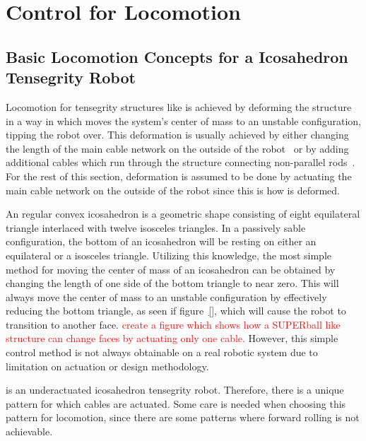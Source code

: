 \chapter{Control for \SB{} Locomotion}
\label{controls}

\section{Basic Locomotion Concepts for a Icosahedron Tensegrity Robot}
\label{basic_locomotion}

Locomotion for tensegrity structures like \SB{} is achieved by deforming the structure in a way in which moves the system's center of mass to an unstable configuration, tipping the robot over.
This deformation is usually achieved by either changing the length of the main cable network on the outside of the robot~\cite{sabelhaus2015system,kim2014rapid} or by adding additional cables which run through the structure connecting non-parallel rods~\cite{caluwaerts2014design}.
For the rest of this section, deformation is assumed to be done by actuating the main cable network on the outside of the robot since this is how \SB{} is deformed.

An regular convex icosahedron is a geometric shape consisting of eight equilateral triangle interlaced with twelve isosceles triangles.
In a passively sable configuration, the bottom of an icosahedron will be resting on either an equilateral or a isosceles triangle.
Utilizing this knowledge, the most simple method for moving the center of mass of an icosahedron can be obtained by changing the length of one side of the bottom triangle to near zero.
This will always move the center of mass to an unstable configuration by effectively reducing the bottom triangle, as seen if figure~\ref{}, which will cause the robot to transition to another face.
\textcolor{red}{create a figure which shows how a SUPERball like structure can change faces by actuating only one cable.}
However, this simple control method is not always obtainable on a real robotic system due to limitation on actuation or design methodology.

\SB{} is an underactuated icosahedron tensegrity robot.
Therefore, there is a unique pattern for which cables are actuated.
Some care is needed when choosing this pattern for locomotion, since there are some patterns where forward rolling is not achievable. 




